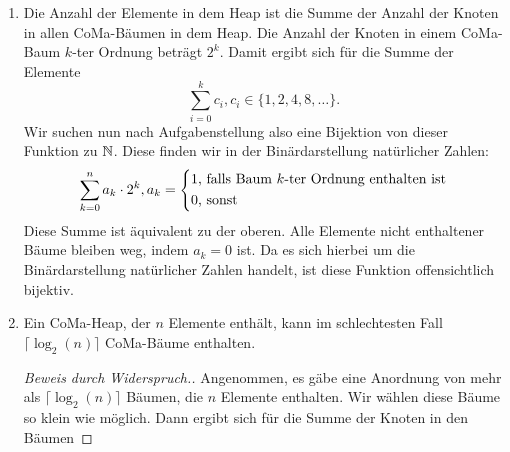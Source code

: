 \documentclass{scrartcl} %
\begin{document}
\begin{aufgabe}
\begin{enumerate}[label=(\alph*)]
\begin{proof}[Beweis mittels starker Induktion]
                Induktionsvoraussetzung:

                Für alle $j \in \N: 0 \leq j < k$ gelte: Alle CoMa-Bäume $j$-ter Ordnung haben $2^j$ Knoten.

                Induktionsschritt: $(j \to k)$:

                Dann hat ein CoMa-Baum $k$-ter Ordnung $2^k$ Knoten: Ein CoMa-Baum $k$-ter Ordnung besteht aus einem Wurzelknoten plus allen Bäumen mit Ordnung $j: 0 \leq j < k$. Also hat laut Induktionsvoraussetzung ein Baum $k$-ter Ordnung exakt
                \[
                    \sum_{j = 0}^{k - 1}2^j + 1
                \]
                Knoten. Aus dem vorherigen Beweis wissen wir, dass gilt:
                \[
                    \sum_{j = 0}^{k - 1}2^j + 1 = 2^k.
                \]
                Also hat ein CoMa-Baum $k$-ter Ordnung $2^k$ Knoten.
            \end{proof}
            \item Die Anzahl der Elemente in dem Heap ist die Summe der Anzahl der Knoten in allen CoMa-Bäumen in dem Heap. Die Anzahl der Knoten in einem CoMa-Baum $k$-ter Ordnung beträgt $2^k$. Damit ergibt sich für die Summe der Elemente
            \[
                \sum_{i = 0}^k c_i, c_i \in \{1, 2, 4, 8, \ldots\}.
            \]
            Wir suchen nun nach Aufgabenstellung also eine Bijektion von dieser Funktion zu $\operatorname{\mathbb N}$. Diese finden wir in der Binärdarstellung natürlicher Zahlen:
            \[
                \sum_{k = 0}^{n} a_k\cdot 2^k, a_k = \begin{dcases*}
                    1 \text{, falls Baum $k$-ter Ordnung enthalten ist} \\
                    0 \text{, sonst}
                \end{dcases*}
            \]
            Diese Summe ist äquivalent zu der oberen. Alle Elemente nicht enthaltener Bäume bleiben weg, indem $a_k = 0$ ist. Da es sich hierbei um die Binärdarstellung natürlicher Zahlen handelt, ist diese Funktion offensichtlich bijektiv.
            \item 
            \begin{theorem*}
                Ein CoMa-Heap, der $n$ Elemente enthält, kann im schlechtesten Fall $\lceil\log_2(n)\rceil$ CoMa-Bäume enthalten. 
            \end{theorem*}
            \begin{proof}[Beweis durch Widerspruch.]
                Angenommen, es gäbe eine Anordnung von mehr als $\lceil\log_2(n)\rceil$ Bäumen, die $n$ Elemente enthalten. Wir wählen diese Bäume so klein wie möglich. Dann ergibt sich für die Summe der Knoten in den Bäumen

\end{proof}
\end{enumerate}
\end{aufgabe}
\end{document}
